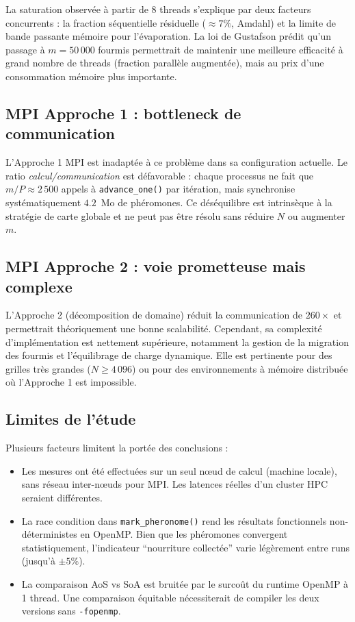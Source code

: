 La saturation observée à partir de 8 threads s'explique par deux facteurs concurrents :
la fraction séquentielle résiduelle ($\approx 7\%$, Amdahl) et la limite de bande
passante mémoire pour l'évaporation. La loi de Gustafson prédit qu'un passage à
$m = 50\,000$ fourmis permettrait de maintenir une meilleure efficacité à grand
nombre de threads (fraction parallèle augmentée), mais au prix d'une consommation
mémoire plus importante.

\subsection{MPI Approche 1 : bottleneck de communication}

L'Approche 1 MPI est inadaptée à ce problème dans sa configuration actuelle.
Le ratio \emph{calcul/communication} est défavorable : chaque processus ne fait que
$m/P \approx 2\,500$ appels à \texttt{advance\_one()} par itération, mais synchronise
systématiquement $4.2$~Mo de phéromones. Ce déséquilibre est intrinsèque à la stratégie
de carte globale et ne peut pas être résolu sans réduire $N$ ou augmenter $m$.

\subsection{MPI Approche 2 : voie prometteuse mais complexe}

L'Approche 2 (décomposition de domaine) réduit la communication de $260\times$ et
permettrait théoriquement une bonne scalabilité. Cependant, sa complexité d'implémentation
est nettement supérieure, notamment la gestion de la migration des fourmis et
l'équilibrage de charge dynamique. Elle est pertinente pour des grilles très grandes
($N \geq 4\,096$) ou pour des environnements à mémoire distribuée où l'Approche 1
est impossible.

\subsection{Limites de l'étude}

Plusieurs facteurs limitent la portée des conclusions :

\begin{itemize}
    \item Les mesures ont été effectuées sur un seul nœud de calcul (machine locale),
          sans réseau inter-nœuds pour MPI. Les latences réelles d'un cluster HPC
          seraient différentes.
    \item La race condition dans \texttt{mark\_pheronome()} rend les résultats
          fonctionnels non-déterministes en OpenMP. Bien que les phéromones
          convergent statistiquement, l'indicateur ``nourriture collectée'' varie
          légèrement entre runs (jusqu'à $\pm 5\%$).
    \item La comparaison AoS vs SoA est bruitée par le surcoût du runtime OpenMP
          à 1 thread. Une comparaison équitable nécessiterait de compiler les deux
          versions sans \texttt{-fopenmp}.
\end{itemize}

